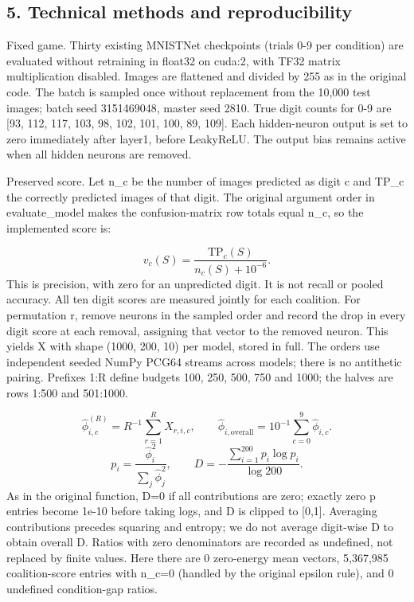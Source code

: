 \documentclass[10pt,a4paper]{article}
\begin{document}
\newpage
\subsection*{5. Technical methods and reproducibility}
Fixed game. Thirty existing MNISTNet checkpoints (trials 0-9 per condition) are evaluated without retraining in float32 on cuda:2, with TF32 matrix multiplication disabled. Images are flattened and divided by 255 as in the original code. The batch is sampled once without replacement from the 10,000 test images; batch seed 3151469048, master seed 2810. True digit counts for 0-9 are [93, 112, 117, 103, 98, 102, 101, 100, 89, 109]. Each hidden-neuron output is set to zero immediately after layer1, before LeakyReLU. The output bias remains active when all hidden neurons are removed.

Preserved score. Let n\_c be the number of images predicted as digit c and TP\_c the correctly predicted images of that digit. The original argument order in evaluate\_model makes the confusion-matrix row totals equal n\_c, so the implemented score is:

\[v_c(S)=\frac{\mathrm{TP}_c(S)}{n_c(S)+10^{-6}}.\]
This is precision, with zero for an unpredicted digit. It is not recall or pooled accuracy. All ten digit scores are measured jointly for each coalition. For permutation r, remove neurons in the sampled order and record the drop in every digit score at each removal, assigning that vector to the removed neuron. This yields X with shape (1000, 200, 10) per model, stored in full. The orders use independent seeded NumPy PCG64 streams across models; there is no antithetic pairing. Prefixes 1:R define budgets 100, 250, 500, 750 and 1000; the halves are rows 1:500 and 501:1000.

\[\widehat\phi_{i,c}^{(R)}=R^{-1}\sum_{r=1}^{R}X_{r,i,c},\qquad\widehat\phi_{i,\mathrm{overall}}=10^{-1}\sum_{c=0}^{9}\widehat\phi_{i,c}.\]
\[p_i=\frac{\widehat\phi_i^2}{\sum_j\widehat\phi_j^2},\qquad D=-\frac{\sum_{i=1}^{200}p_i\log p_i}{\log 200}.\]
As in the original function, D=0 if all contributions are zero; exactly zero p entries become 1e-10 before taking logs, and D is clipped to [0,1]. Averaging contributions precedes squaring and entropy; we do not average digit-wise D to obtain overall D. Ratios with zero denominators are recorded as undefined, not replaced by finite values. Here there are 0 zero-energy mean vectors, 5,367,985 coalition-score entries with n\_c=0 (handled by the original epsilon rule), and 0 undefined condition-gap ratios.
\end{document}

